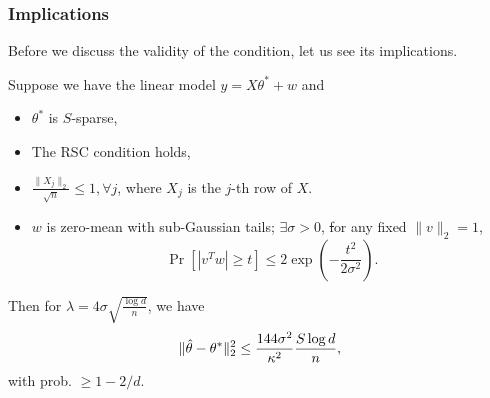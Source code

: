 \subsubsection{Implications}

Before we discuss the validity of the condition,
let us see its implications.

\begin{pro}
    Suppose we have the linear model $y=X\theta^*+w$ and
    \begin{itemize}
        \item $\theta^*$ is $S$-sparse,
        \item The RSC condition holds,
        \item $\frac{\|X_j\|_2}{\sqrt{n}}\le 1, \forall j$,
            where $X_j$ is the $j$-th row of $X$.
        \item $w$ is zero-mean with sub-Gaussian tails; \ie
            $\exists \sigma>0$, \st for any fixed $\|v\|_2=1$,
            \begin{equation}
                \Pr[|v^Tw|\ge t] \le 2\exp(-\frac{t^2}{2\sigma^2}).
            \end{equation}
    \end{itemize}
    Then for $\lambda=4\sigma\sqrt{\frac{\log d}{n}}$, we have
    \begin{equation}
        \|{\hat{\theta}}-\theta^*\|_2^2\le \frac{144\sigma^2}{\kappa^2}\frac{S\log d}{n},
    \end{equation}
    with prob. $\ge 1-2/d$.
\end{pro}

